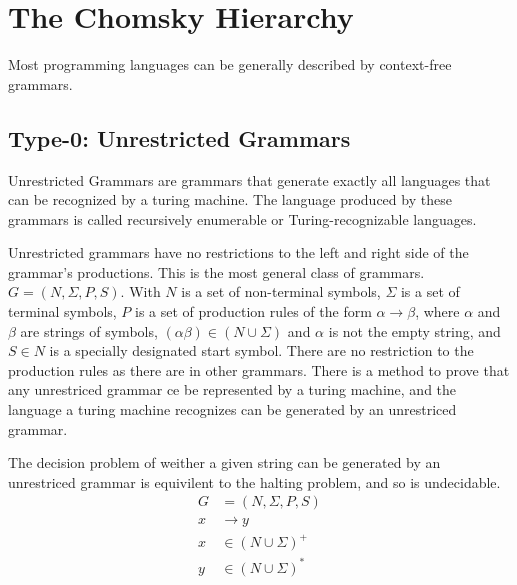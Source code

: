 \documentclass[12pt]{article}
\begin{document}
\nocite{*}
\section{The Chomsky Hierarchy}
Most programming languages can be generally described by context-free grammars.
\subsection{Type-0: Unrestricted Grammars}
\par
Unrestricted Grammars are grammars that generate exactly all languages that can be recognized by a turing machine. The language produced by these grammars is called recursively enumerable or Turing-recognizable languages.
\par
Unrestricted grammars have no restrictions to the left and right side of the grammar's productions. This is the most general class of grammars. $G = (N, \Sigma, P, S)$. With $N$ is a set of non-terminal symbols, $\Sigma$ is a set of terminal symbols, $P$ is a set of production rules of the form $\alpha \rightarrow \beta$, where $\alpha$ and $\beta$ are strings of symbols, $(\alpha \beta)\in (N\cup \Sigma)$ and $\alpha$ is not the empty string, and $S\in N$ is a specially designated start symbol. There are no restriction to the production rules as there are in other grammars. There is a method to prove that any unrestriced grammar ce be represented by a turing machine, and the language a turing machine recognizes can be generated by an unrestriced grammar.
\par
The decision problem of weither a given string can be generated by an unrestriced grammar is equivilent to the halting problem, and so is undecidable.
\begin{align*}
  G &=(N, \Sigma, P, S)\\
  x &\rightarrow y\\
  x &\in(N\cup\Sigma)^{+}\\
  y &\in(N\cup\Sigma)^{*}\\
\end{align*}
\end{document}
